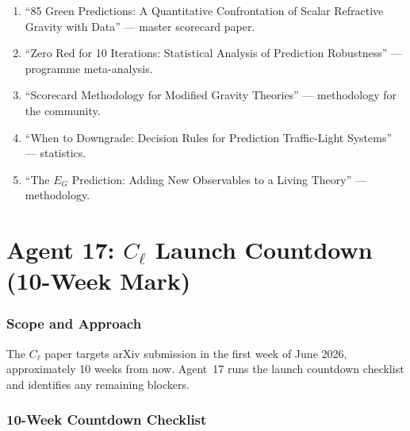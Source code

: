\documentclass[11pt,a4paper]{article}
\begin{document}
\begin{enumerate}
\item ``85 Green Predictions: A Quantitative Confrontation of Scalar Refractive Gravity with Data'' --- master scorecard paper.
\item ``Zero Red for 10 Iterations: Statistical Analysis of Prediction Robustness'' --- programme meta-analysis.
\item ``Scorecard Methodology for Modified Gravity Theories'' --- methodology for the community.
\item ``When to Downgrade: Decision Rules for Prediction Traffic-Light Systems'' --- statistics.
\item ``The $E_G$ Prediction: Adding New Observables to a Living Theory'' --- methodology.
\end{enumerate}


\part{Agent 17: $C_\ell$ Launch Countdown (10-Week Mark)}
\label{part:launch-countdown}

\section{Scope and Approach}

The $C_\ell$ paper targets arXiv submission in the first week of June 2026, approximately 10 weeks from now. Agent~17 runs the launch countdown checklist and identifies any remaining blockers.

\section{10-Week Countdown Checklist}
\end{document}

